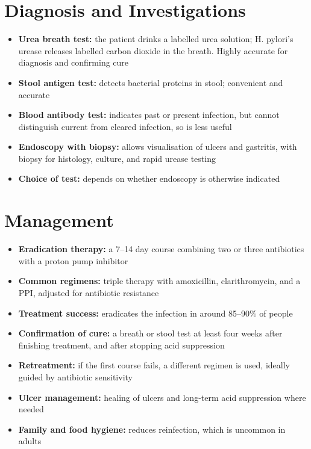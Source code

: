 \section*{Diagnosis and Investigations}
\begin{itemize}
    \item \textbf{Urea breath test:} the patient drinks a labelled urea solution; H. pylori's urease releases labelled carbon dioxide in the breath. Highly accurate for diagnosis and confirming cure
    \item \textbf{Stool antigen test:} detects bacterial proteins in stool; convenient and accurate
    \item \textbf{Blood antibody test:} indicates past or present infection, but cannot distinguish current from cleared infection, so is less useful
    \item \textbf{Endoscopy with biopsy:} allows visualisation of ulcers and gastritis, with biopsy for histology, culture, and rapid urease testing
    \item \textbf{Choice of test:} depends on whether endoscopy is otherwise indicated
\end{itemize}

\section*{Management}
\begin{itemize}
    \item \textbf{Eradication therapy:} a 7--14 day course combining two or three antibiotics with a proton pump inhibitor
    \item \textbf{Common regimens:} triple therapy with amoxicillin, clarithromycin, and a PPI, adjusted for antibiotic resistance
    \item \textbf{Treatment success:} eradicates the infection in around 85--90\% of people
    \item \textbf{Confirmation of cure:} a breath or stool test at least four weeks after finishing treatment, and after stopping acid suppression
    \item \textbf{Retreatment:} if the first course fails, a different regimen is used, ideally guided by antibiotic sensitivity
    \item \textbf{Ulcer management:} healing of ulcers and long-term acid suppression where needed
    \item \textbf{Family and food hygiene:} reduces reinfection, which is uncommon in adults
\end{itemize}

